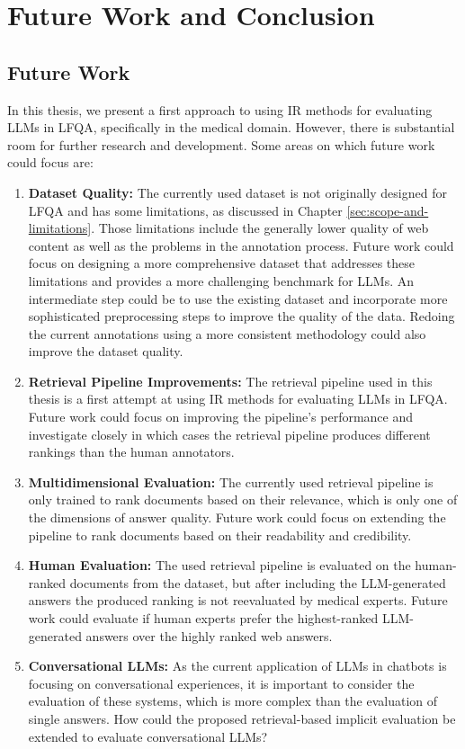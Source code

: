 \chapter{Future Work and Conclusion}\label{conclusion}

\section{Future Work}
In this thesis, we present a first approach to using IR methods for evaluating LLMs in LFQA, specifically in the medical domain.
However, there is substantial room for further research and development.
Some areas on which future work could focus are:

\begin{enumerate}
    \item \textbf{Dataset Quality:} The currently used dataset is not originally designed for LFQA and has some limitations, as discussed in Chapter \ref{sec:scope-and-limitations}. Those limitations include the generally lower quality of web content as well as the problems in the annotation process. Future work could focus on designing a more comprehensive dataset that addresses these limitations and provides a more challenging benchmark for LLMs. An intermediate step could be to use the existing dataset and incorporate more sophisticated preprocessing steps to improve the quality of the data. Redoing the current annotations using a more consistent methodology could also improve the dataset quality.
    \item \textbf{Retrieval Pipeline Improvements:} The retrieval pipeline used in this thesis is a first attempt at using IR methods for evaluating LLMs in LFQA. Future work could focus on improving the pipeline's performance and investigate closely in which cases the retrieval pipeline produces different rankings than the human annotators.
    \item \textbf{Multidimensional Evaluation:} The currently used retrieval pipeline is only trained to rank documents based on their relevance, which is only one of the dimensions of answer quality. Future work could focus on extending the pipeline to rank documents based on their readability and credibility.
    \item \textbf{Human Evaluation:} The used retrieval pipeline is evaluated on the human-ranked documents from the dataset, but after including the LLM-generated answers the produced ranking is not reevaluated by medical experts. Future work could evaluate if human experts prefer the highest-ranked LLM-generated answers over the highly ranked web answers.
    \item \textbf{Conversational LLMs:} As the current application of LLMs in chatbots is focusing on conversational experiences, it is important to consider the evaluation of these systems, which is more complex than the evaluation of single answers. How could the proposed retrieval-based implicit evaluation be extended to evaluate conversational LLMs?
\end{enumerate}

